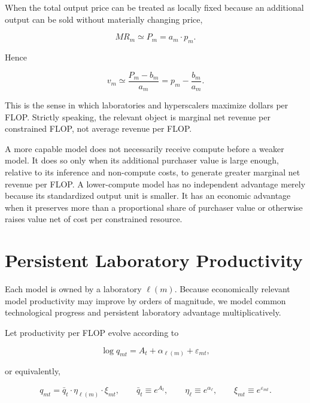 \documentclass[11pt]{article}
\begin{document}
When the total output price can be treated as locally fixed because an additional output can be sold without materially changing price,

\begin{equation}MR_m\simeq P_m=a_m\cdot p_m.\end{equation}

Hence

\begin{equation}v_m\simeq\frac{P_m-b_m}{a_m}=p_m-\frac{b_m}{a_m}.\end{equation}

This is the sense in which laboratories and hyperscalers maximize dollars per FLOP. Strictly speaking, the relevant object is marginal net revenue per constrained FLOP, not average revenue per FLOP.

A more capable model does not necessarily receive compute before a weaker model. It does so only when its additional purchaser value is large enough, relative to its inference and non-compute costs, to generate greater marginal net revenue per FLOP. A lower-compute model has no independent advantage merely because its standardized output unit is smaller. It has an economic advantage when it preserves more than a proportional share of purchaser value or otherwise raises value net of cost per constrained resource.

\section{Persistent Laboratory Productivity}
\label{sec:persistent-advantage}

Each model is owned by a laboratory $\ell(m)$. Because economically relevant model productivity may improve by orders of magnitude, we model common technological progress and persistent laboratory advantage multiplicatively.

Let productivity per FLOP evolve according to

\begin{equation}\log q_{mt}=A_t+\alpha_{\ell(m)}+\varepsilon_{mt},\end{equation}

or equivalently,

\begin{equation}q_{mt}=\bar q_t\cdot\eta_{\ell(m)}\cdot\xi_{mt},\qquad \bar q_t\equiv e^{A_t},\qquad \eta_\ell\equiv e^{\alpha_\ell},\qquad \xi_{mt}\equiv e^{\varepsilon_{mt}}.\end{equation}
\end{document}
